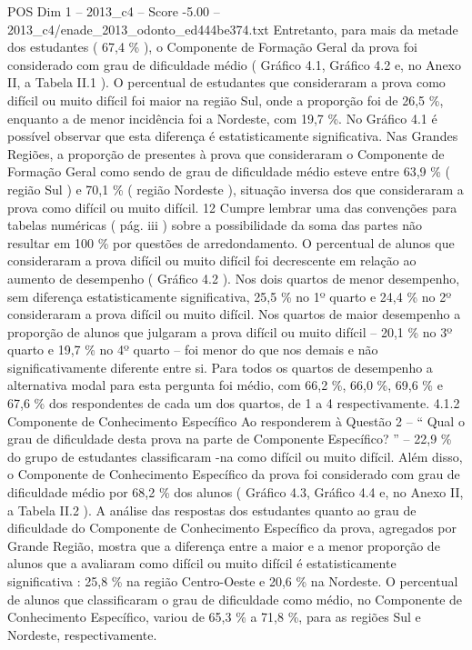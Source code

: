 \begin{textsample}{POS Dim 1 – 2013\_c4 – Score -5.00 – 2013\_c4/enade\_2013\_odonto\_ed444be374.txt}
Entretanto, para mais da metade dos estudantes ( 67,4 \% ), o Componente de Formação Geral da prova foi considerado com grau de dificuldade médio ( Gráfico 4.1, Gráfico 4.2 e, no Anexo II, a Tabela II.1 ).
O percentual de estudantes que consideraram a prova como difícil ou muito difícil foi maior na região Sul, onde a proporção foi de 26,5 \%, enquanto a de menor incidência foi a Nordeste, com 19,7 \%.
No Gráfico 4.1 é possível observar que esta diferença é estatisticamente significativa.
Nas Grandes Regiões, a proporção de presentes à prova que consideraram o Componente de Formação Geral como sendo de grau de dificuldade médio esteve entre 63,9 \% ( região Sul ) e 70,1 \% ( região Nordeste ), situação inversa dos que consideraram a prova como difícil ou muito difícil. 12 Cumpre lembrar uma das convenções para tabelas numéricas ( pág. iii ) sobre a possibilidade da soma das partes não resultar em 100 \% por questões de arredondamento.
O percentual de alunos que consideraram a prova difícil ou muito difícil foi decrescente em relação ao aumento de desempenho ( Gráfico 4.2 ).
Nos dois quartos de menor desempenho, sem diferença estatisticamente significativa, 25,5 \% no 1º quarto e 24,4 \% no 2º consideraram a prova difícil ou muito difícil.
Nos quartos de maior desempenho a proporção de alunos que julgaram a prova difícil ou muito difícil – 20,1 \% no 3º quarto e 19,7 \% no 4º quarto – foi menor do que nos demais e não significativamente diferente entre si.
Para todos os quartos de desempenho a alternativa modal para esta pergunta foi médio, com 66,2 \%, 66,0 \%, 69,6 \% e 67,6 \% dos respondentes de cada um dos quartos, de 1 a 4 respectivamente. 4.1.2 Componente de Conhecimento Específico Ao responderem à Questão 2 – “ Qual o grau de dificuldade desta prova na parte de Componente Específico? ” – 22,9 \% do grupo de estudantes classificaram -na como difícil ou muito difícil.
Além disso, o Componente de Conhecimento Específico da prova foi considerado com grau de dificuldade médio por 68,2 \% dos alunos ( Gráfico 4.3, Gráfico 4.4 e, no Anexo II, a Tabela II.2 ).
A análise das respostas dos estudantes quanto ao grau de dificuldade do Componente de Conhecimento Específico da prova, agregados por Grande Região, mostra que a diferença entre a maior e a menor proporção de alunos que a avaliaram como difícil ou muito difícil é estatisticamente significativa : 25,8 \% na região Centro-Oeste e 20,6 \% na Nordeste.
O percentual de alunos que classificaram o grau de dificuldade como médio, no Componente de Conhecimento Específico, variou de 65,3 \% a 71,8 \%, para as regiões Sul e Nordeste, respectivamente.

\end{textsample}
